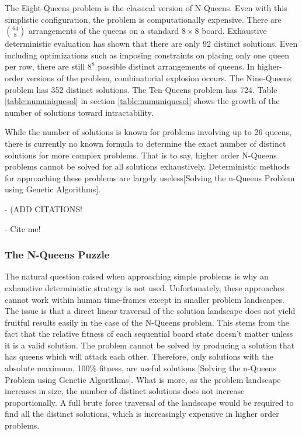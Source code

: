 \documentclass{sig-alternate}
\begin{document}
The Eight-Queens problem is the classical version of N-Queens. Even with this simplistic configuration, the problem is computationally expensive. There are {$64 \choose 8$} arrangements of the queens on a standard {$8\times{}8$} board. Exhaustive deterministic evaluation has shown that there are only 92 distinct solutions. Even including optimizations such as imposing constraints on placing only one queen per row, there are still {$8^8$} possible distinct arrangements of queens. In higher-order versions of the problem, combinatorial explosion occurs. The Nine-Queens problem has 352 distinct solutions. The Ten-Queens problem has 724. Table \ref{table:numuniquesol} in section \ref{table:numuniquesol} shows the growth of the number of solutions toward intractability. 

While the number of solutions is known for problems involving up to 26 queens, there is currently no known formula to determine the exact number of distinct solutions for more complex problems. That is to say, higher order N-Queens problems cannot be solved for all solutions exhaustively. Deterministic methods for approaching these problems are largely useless[Solving the n-Queens Problem using Genetic Algorithms].

- (ADD CITATIONS!
  
- Cite me!\cite{crawford1992solving,homaifar1992e1,andrews2006investigation,tuson1998adapting, wolpert1997no,srinivas1994adaptive,goldberg1988genetic}

\subsubsection{The N-Queens Puzzle}
The natural question raised when approaching simple problems is why an exhaustive deterministic strategy is not used. Unfortunately, these approaches cannot work within human time-frames except in smaller problem landscapes. The issue is that a direct linear traversal of the solution landscape does not yield fruitful results easily in the case of the N-Queens problem. This stems from the fact that the relative fitness of each sequential board state doesn't matter unless it is a valid solution. The problem cannot be solved by producing a solution that has queens which will attack each other. Therefore, only solutions with the absolute maximum, 100\% fitness, are useful solutions [Solving the n-Queens Problem using Genetic Algorithms]. What is more, as the problem landscape increases in size, the number of distinct solutions does not increase proportionally. A full brute force traversal of the landscape would be required to find all the distinct solutions, which is increasingly expensive in higher order problems.
\end{document}
